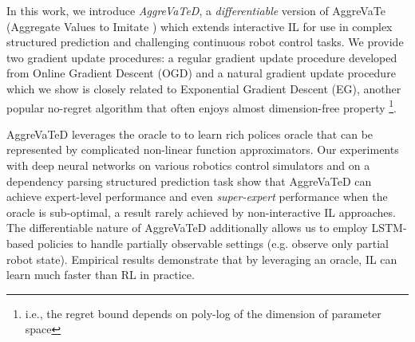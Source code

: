 \documentclass{article}
\newcommand{\arun}[1]{\textcolor{red}{\bf Arun: {#1}}}
\begin{document}

In this work, we introduce \emph{AggreVaTeD}, a \emph{differentiable} version of AggreVaTe (Aggregate Values to Imitate \cite{ross2014reinforcement}) which extends interactive IL for use in complex structured prediction and challenging continuous robot control tasks.  We provide two gradient update procedures: a regular gradient update procedure developed from Online Gradient Descent (OGD) \cite{Zinkevich2003_ICML} and a natural gradient update procedure \cite{kakade2002natural,bagnell2003covariant} which we show is closely related to Exponential Gradient Descent (EG), another popular no-regret algorithm that often enjoys almost dimension-free property \cite{bubeck2015convex}\footnote{i.e., the regret bound depends on poly-log of the dimension of parameter space}. %

AggreVaTeD leverages the oracle to to learn rich polices oracle that can be represented by complicated non-linear function approximators. Our experiments with deep neural networks on various robotics control simulators and on a dependency parsing structured prediction task show that AggreVaTeD can achieve expert-level performance and even \emph{super-expert} performance when the oracle is sub-optimal, a result rarely achieved by non-interactive IL approaches. The differentiable nature of AggreVaTeD additionally allows us to employ LSTM-based policies to handle partially observable settings (e.g. observe only partial robot state). Empirical results demonstrate that by leveraging an oracle, IL can learn much faster than RL in practice.
\end{document}
